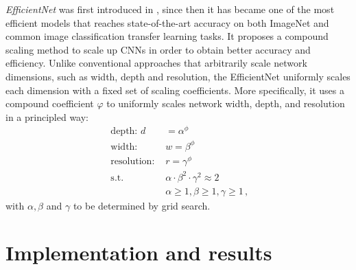 \documentclass[11pt]{m2pi_v2}
\begin{document}
\textit{EfficientNet}  was first introduced in \cite{tan2019efficientnet}, since then it has became one of the most efficient models that reaches state-of-the-art accuracy on both ImageNet and common image classification transfer learning tasks. It proposes a compound scaling method  to scale up CNNs in order to obtain better accuracy and efficiency. Unlike conventional approaches that arbitrarily scale network dimensions, such as width, depth and resolution, the EfficientNet uniformly scales each dimension with a fixed set of scaling coefficients. More specifically, it uses a compound coefficient $\varphi$ to uniformly scales network width, depth, and resolution in a principled way:
\begin{equation*}
\begin{aligned}
\text { depth: } d &=\alpha^{\phi} \\
\text { width: } & w=\beta^{\phi} \\
\text { resolution: } & r=\gamma^{\phi} \\
\text { s.t. } & \alpha \cdot \beta^{2} \cdot \gamma^{2} \approx 2 \\
& \alpha \geq 1, \beta \geq 1, \gamma \geq 1\,,
\end{aligned}
\end{equation*}
with $\alpha, \beta$ and $\gamma$ to be determined by grid search. 







\newpage
\section{Implementation and results} 
\end{document}
